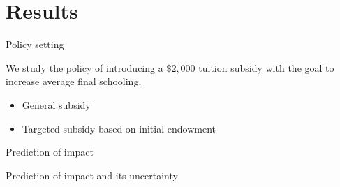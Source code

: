 \section{Results}\addtocounter{framenumber}{-1}
\begin{frame}{Policy setting}\vspace{0.25cm}

We study the policy of introducing a $\$2,000$ tuition subsidy with the goal to increase average final schooling.\vspace{0.35cm}

\begin{itemize}\setlength\itemsep{1em}
  \item General subsidy
  \item Targeted subsidy based on initial endowment
\end{itemize}

\end{frame}
\begin{frame}{Prediction of impact}\vspace{0.3cm}
  \begin{figure}[h!]\centering
  \end{figure}
\end{frame}\addtocounter{framenumber}{-1}
\begin{frame}{Prediction of impact and its uncertainty}\vspace{0.3cm}
  \begin{figure}[h!]\centering
  \end{figure}
\end{frame}
